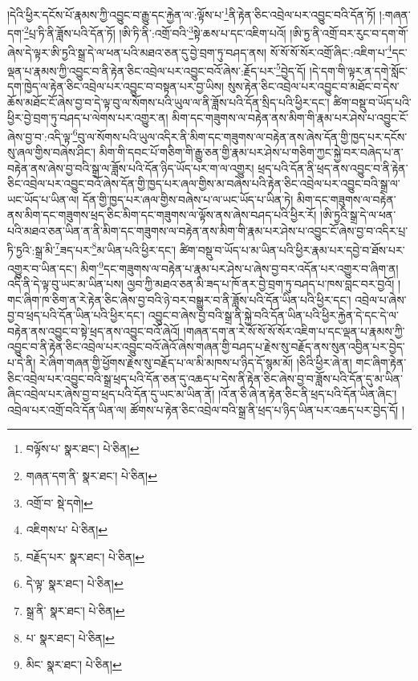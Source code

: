 །དེའི་ཕྱིར་དངོས་པོ་རྣམས་ཀྱི་འབྱུང་བ་རྒྱུ་དང་རྐྱེན་ལ་:ལྟོས་པ་\footnote{བལྟོས་པ་  སྣར་ཐང་།  པེ་ཅིན། }ནི་རྟེན་ཅིང་འབྲེལ་པར་འབྱུང་བའི་དོན་ཏོ། །:གཞན་དག་\footnote{གཞན་དག་ནི་  སྣར་ཐང་།  པེ་ཅིན། }པྲ་ཏི་ནི་ཟློས་པའི་དོན་ཏོ། །ཨི་ཏི་ནི་:འགྲོ་བའི་\footnote{འགྲོ་བ་  སྡེ་དགེ། }སྟེ་ཆས་པ་དང་འཇིག་པའོ། །ཨི་ཏྱ་ནི་འགྲོ་བར་རུང་བ་དག་གོ་ཞེས་དེ་ལྟར་ཨི་ཏྱའི་སྒྲ་དེ་ལ་ཕན་པའི་མཐའ་ཅན་དུ་བྱེ་བྲག་ཏུ་བཤད་ནས། སོ་སོ་སོ་སོར་འགྲོ་ཞིང་:འཇིག་པ་\footnote{འཇིགས་པ་  པེ་ཅིན། }དང་ལྡན་པ་རྣམས་ཀྱི་འབྱུང་བ་ནི་རྟེན་ཅིང་འབྲེལ་པར་འབྱུང་བའོ་ཞེས་:རྗོད་པར་\footnote{བརྗོད་པར་  སྣར་ཐང་།  པེ་ཅིན། }བྱེད་དོ། །དེ་དག་གི་ལྟར་ན་དགེ་སློང་དག་ཁྱེད་ལ་རྟེན་ཅིང་འབྲེལ་པར་འབྱུང་བ་བསྟན་པར་བྱ་ཡིས། སུས་རྟེན་ཅིང་འབྲེལ་པར་འབྱུང་བ་མཐོང་བ་དེས་ཆོས་མཐོང་ངོ་ཞེས་བྱ་བ་དེ་ལྟ་བུ་ལ་སོགས་པའི་ཡུལ་ལ་ནི་ཟློས་པའི་དོན་སྲིད་པའི་ཕྱིར་དང་། ཚིག་བསྡུ་བ་ཡོད་པའི་ཕྱིར་བྱེ་བྲག་ཏུ་བཤད་པ་ལེགས་པར་འགྱུར་ན། མིག་དང་གཟུགས་ལ་བརྟེན་ནས་མིག་གི་རྣམ་པར་ཤེས་པ་འབྱུང་ངོ་ཞེས་བྱ་བ་:འདི་ལྟ་\footnote{དེ་ལྟ་  སྣར་ཐང་།  པེ་ཅིན། }བུ་ལ་སོགས་པའི་ཡུལ་འདིར་ནི་མིག་དང་གཟུགས་ལ་བརྟེན་ནས་ཞེས་དོན་གྱི་ཁྱད་པར་དངོས་སུ་ཞལ་གྱིས་བཞེས་ཤིང་། མིག་གི་དབང་པོ་གཅིག་གི་རྒྱུ་ཅན་གྱི་རྣམ་པར་ཤེས་པ་གཅིག་ཀྱང་སྐྱེ་བར་བཞེད་པ་ན་བརྟེན་ནས་ཞེས་བྱ་བའི་སྒྲ་ལ་ཟློས་པའི་དོན་ཉིད་ཡོད་པར་ག་ལ་འགྱུར། ཕྲད་པའི་དོན་ནི་ཕྲད་ནས་འབྱུང་བ་ནི་རྟེན་ཅིང་འབྲེལ་པར་འབྱུང་བའོ་ཞེས་དོན་གྱི་ཁྱད་པར་ཞལ་གྱིས་མ་བཞེས་པའི་རྟེན་ཅིང་འབྲེལ་པར་འབྱུང་བའི་སྒྲ་ལ་ཡང་ཡོད་པ་ཡིན་ལ། དོན་གྱི་ཁྱད་པར་ཞལ་གྱིས་བཞེས་པ་ལ་ཡང་ཡོད་པ་ཡིན་ཏེ། མིག་དང་གཟུགས་ལ་བརྟེན་ནས་མིག་དང་གཟུགས་ཕྲད་ཅིང་མིག་དང་གཟུགས་ལ་ལྟོས་ནས་ཞེས་བཤད་པའི་ཕྱིར་རོ། །ཨི་ཏྱའི་སྒྲ་དེ་ལ་ཕན་པའི་མཐའ་ཅན་ཡིན་ན་ནི་མིག་དང་གཟུགས་ལ་བརྟེན་ནས་མིག་གི་རྣམ་པར་ཤེས་པ་འབྱུང་ངོ་ཞེས་བྱ་བ་འདིར་པྲ་ཏི་ཏྱའི་:སྒྲ་མི་\footnote{སྒྲ་ནི་  སྣར་ཐང་།  པེ་ཅིན། }ཟད་པར་\footnote{པ་  སྣར་ཐང་།  པེ་ཅིན། }མ་ཡིན་པའི་ཕྱིར་དང་། ཚིག་བསྡུ་བ་ཡོད་པ་མ་ཡིན་པའི་ཕྱིར་རྣམ་པར་དབྱེ་བ་ཐོས་པར་འགྱུར་བ་ཡིན་དང་། མིག་\footnote{མིང་  སྣར་ཐང་།  པེ་ཅིན། }དང་གཟུགས་ལ་བརྟེན་པ་རྣམ་པར་ཤེས་པ་ཞེས་བྱ་བར་འདོན་པར་འགྱུར་བ་ཞིག་ན། འདི་ནི་དེ་ལྟ་བུ་ཡང་མ་ཡིན་པས། ལྱབ་ཀྱི་མཐའ་ཅན་མི་ཟད་པ་ཁོ་ནར་བྱེ་བྲག་ཏུ་བཤད་པ་ཁས་བླང་བར་བྱའོ། །གང་ཞིག་ཁ་ཅིག་ན་རེ་རྟེན་ཅིང་ཞེས་བྱ་བའི་ཉེ་བར་བསྒྱུར་བ་ནི་ཟློས་པའི་དོན་ཡིན་པའི་ཕྱིར་དང་། འབྲེལ་པ་ཞེས་བྱ་བ་ཕྲད་པའི་དོན་ཡིན་པའི་ཕྱིར་དང་། འབྱུང་བ་ཞེས་བྱ་བའི་སྒྲ་ནི་སྐྱེ་བའི་དོན་ཡིན་པའི་ཕྱིར་རྐྱེན་དེ་དང་དེ་ལ་བརྟེན་ནས་འབྱུང་བ་སྟེ་ཕྲད་ནས་འབྱུང་བའོ་ཞེའོ། །གཞན་དག་ན་རེ་སོ་སོ་སོ་སོར་འཇིག་པ་དང་ལྡན་པ་རྣམས་ཀྱི་འབྱུང་བ་ནི་རྟེན་ཅིང་འབྲེལ་པར་འབྱུང་བའོ་ཞེའོ་ཞེས་གཞན་གྱི་བཤད་པ་རྗེས་སུ་བརྗོད་ནས་སུན་འབྱིན་པར་བྱེད་པ་དེ་ནི། རེ་ཞིག་གཞན་གྱི་ཕྱོགས་རྗེས་སུ་བརྗོད་པ་ལ་མི་མཁས་པ་ཉིད་དོ་སྙམ་མོ། །ཅིའི་ཕྱིར་ཞེ་ན། གང་ཞིག་རྟེན་ཅིང་འབྲེལ་པར་འབྱུང་བའི་སྒྲ་ཕྲད་པའི་དོན་ཅན་དུ་འཆད་པ་དེས་ནི་རྟེན་ཅིང་ཞེས་བྱ་བ་ཟློས་པའི་དོན་དུ་མ་ཡིན་ཞིང་འབྲེལ་པར་ཞེས་བྱ་བ་ཕྲད་པའི་དོན་དུ་ཡང་མ་ཡིན་ནོ། །འོ་ན་ཅི་ཞེ་ན་རྟེན་ཅིང་ནི་ཕྲད་པའི་དོན་ཡིན་ཞིང་། འབྲེལ་པར་འགྲོ་བའི་དོན་ཡིན་ལ། ཚོགས་པ་རྟེན་ཅིང་འབྲེལ་བའི་སྒྲ་ནི་ཕྲད་པ་ཉིད་ཡིན་པར་འཆད་པར་བྱེད་དོ། །
